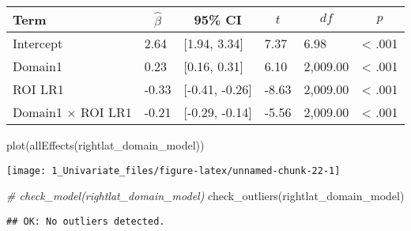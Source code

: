 \documentclass[
]{article}
\newenvironment{Shaded}{\begin{snugshade}}{\end{snugshade}}
\newcommand{\CommentTok}[1]{\textcolor[rgb]{0.56,0.35,0.01}{\textit{#1}}}
\newcommand{\FunctionTok}[1]{\textcolor[rgb]{0.00,0.00,0.00}{#1}}
\newcommand{\NormalTok}[1]{#1}
\newcommand{\SpecialCharTok}[1]{\textcolor[rgb]{0.00,0.00,0.00}{#1}}
\begin{document}
\begin{table}[tbp]

\begin{center}
\begin{threeparttable}

\caption{\label{tab:unnamed-chunk-22}}

\begin{tabular}{llllll}
\toprule
Term & \multicolumn{1}{c}{$\hat{\beta}$} & \multicolumn{1}{c}{95\% CI} & \multicolumn{1}{c}{$t$} & \multicolumn{1}{c}{$\mathit{df}$} & \multicolumn{1}{c}{$p$}\\
\midrule
Intercept & 2.64 & {}[1.94, 3.34] & 7.37 & 6.98 & < .001\\
Domain1 & 0.23 & {}[0.16, 0.31] & 6.10 & 2,009.00 & < .001\\
ROI LR1 & -0.33 & {}[-0.41, -0.26] & -8.63 & 2,009.00 & < .001\\
Domain1 $\times$ ROI LR1 & -0.21 & {}[-0.29, -0.14] & -5.56 & 2,009.00 & < .001\\
\bottomrule
\end{tabular}

\end{threeparttable}
\end{center}

\end{table}

\begin{Shaded}
\begin{Highlighting}[]
\FunctionTok{plot}\NormalTok{(}\FunctionTok{allEffects}\NormalTok{(rightlat\_domain\_model))}
\end{Highlighting}
\end{Shaded}

\texttt{[image: 1\_Univariate\_files/figure-latex/unnamed-chunk-22-1]}

\begin{Shaded}
\begin{Highlighting}[]
\CommentTok{\# check\_model(rightlat\_domain\_model)}
\FunctionTok{check\_outliers}\NormalTok{(rightlat\_domain\_model)}
\end{Highlighting}
\end{Shaded}

\begin{verbatim}
## OK: No outliers detected.
\end{verbatim}

\begin{Shaded}
\end{Shaded}
\end{document}

